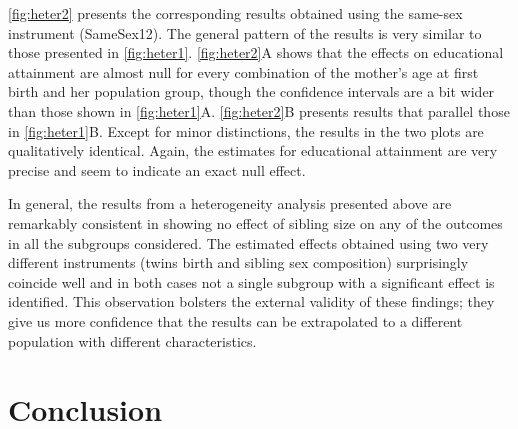 %

\autoref{fig:heter2} presents the corresponding results obtained using the same-sex instrument (SameSex12). The general pattern of the results is very similar to those presented in \autoref{fig:heter1}. \autoref{fig:heter2}A shows that the effects on educational attainment are almost null for every combination of the mother's age at first birth and her population group, though the confidence intervals are a bit wider than those shown in \autoref{fig:heter1}A. \autoref{fig:heter2}B presents results that parallel those in \autoref{fig:heter1}B. Except for minor distinctions, the results in the two plots are qualitatively identical. Again, the estimates for educational attainment are very precise and seem to indicate an exact null effect. 

In general, the results from a heterogeneity analysis presented above are remarkably consistent in showing no effect of sibling size on any of the outcomes in all the subgroups considered. The estimated effects obtained using two very different instruments (twins birth and sibling sex composition) surprisingly coincide well and in both cases not a single subgroup with a significant effect is identified. This observation bolsters the external validity of these findings; they give us more confidence that the results can be extrapolated to a different population with different characteristics. 

\section{Conclusion}
\label{section:conclude}

